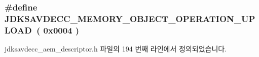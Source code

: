 \subsubsection[{\texorpdfstring{J\+D\+K\+S\+A\+V\+D\+E\+C\+C\+\_\+\+M\+E\+M\+O\+R\+Y\+\_\+\+O\+B\+J\+E\+C\+T\+\_\+\+O\+P\+E\+R\+A\+T\+I\+O\+N\+\_\+\+U\+P\+L\+O\+AD}{JDKSAVDECC_MEMORY_OBJECT_OPERATION_UPLOAD}}]{\setlength{\rightskip}{0pt plus 5cm}\#define J\+D\+K\+S\+A\+V\+D\+E\+C\+C\+\_\+\+M\+E\+M\+O\+R\+Y\+\_\+\+O\+B\+J\+E\+C\+T\+\_\+\+O\+P\+E\+R\+A\+T\+I\+O\+N\+\_\+\+U\+P\+L\+O\+AD~( 0x0004 )}\hypertarget{group__memory__object__operation_ga12771131c3cd62bc914e847886a74f00}{}\label{group__memory__object__operation_ga12771131c3cd62bc914e847886a74f00}


jdksavdecc\+\_\+aem\+\_\+descriptor.\+h 파일의 194 번째 라인에서 정의되었습니다.

